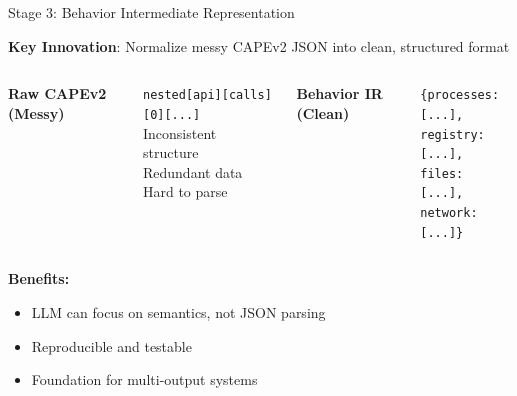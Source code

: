 \documentclass[11pt,aspectratio=16:9]{beamer}
\begin{document}
\begin{frame}{Stage 3: Behavior Intermediate Representation}
  \vspace{0.5cm}
  \begin{tcolorbox}[colback=accent1!10, colframe=accent1, boxrule=1pt]
    \textbf{Key Innovation}: Normalize messy CAPEv2 JSON into clean, structured format
  \end{tcolorbox}
  
  \vspace{0.5cm}
  \begin{columns}
    {\footnotesize \textbf{Raw CAPEv2 (Messy)}}
    \begin{tcolorbox}[colback=red!5]
      \texttt{nested[api][calls][0][...]} \\
      {\small Inconsistent structure} \\
      {\small Redundant data} \\
      {\small Hard to parse}
    \end{tcolorbox}
    
    {\footnotesize \textbf{Behavior IR (Clean)}}
    \begin{tcolorbox}[colback=green!5]
      \texttt{\{processes: [...], \\
        registry: [...], \\
        files: [...], \\
        network: [...]\}}
    \end{tcolorbox}
  \end{columns}
  
  \vspace{0.5cm}
  \textbf{Benefits:}
  \begin{itemize}
    \item LLM can focus on semantics, not JSON parsing
    \item Reproducible and testable
    \item Foundation for multi-output systems
  \end{itemize}
\end{frame}
\end{document}
